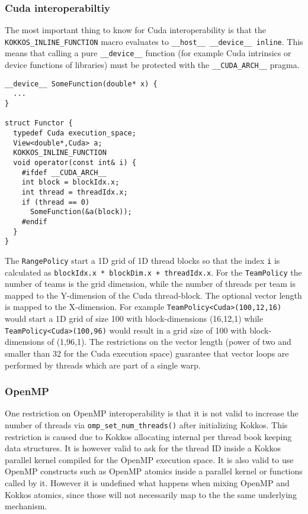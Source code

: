 \subsubsection{Cuda interoperabiltiy}

The most important thing to know for Cuda interoperability is that the
\lstinline|KOKKOS_INLINE_FUNCTION| macro evaluates to 
\lstinline|__host__ __device__ inline|. This means that calling a pure
\lstinline|__device__| function (for example Cuda intrinsics or device 
functions of libraries) must be protected with the \lstinline|__CUDA_ARCH__|
pragma.

\begin{lstlisting}
__device__ SomeFunction(double* x) {
  ...
}

struct Functor {
  typedef Cuda execution_space;
  View<double*,Cuda> a;
  KOKKOS_INLINE_FUNCTION
  void operator(const int& i) {
    #ifdef __CUDA_ARCH__
    int block = blockIdx.x;
    int thread = threadIdx.x;
    if (thread == 0)
      SomeFunction(&a(block));
    #endif
  }
}
\end{lstlisting}

The \lstinline|RangePolicy| start a 1D grid of 1D thread blocks so that the index 
\lstinline|i| is calculated as \lstinline|blockIdx.x * blockDim.x + threadIdx.x|. 
For the \lstinline|TeamPolicy| the number of teams is the grid dimension, while
the number of threads per team is mapped to the Y-dimension of the Cuda 
thread-block. The optional vector length is mapped to the X-dimension. 
For example \lstinline|TeamPolicy<Cuda>(100,12,16)| would start a 1D grid of size 
100 with block-dimensions (16,12,1) while \lstinline|TeamPolicy<Cuda>(100,96)| would 
result in a grid size of 100 with block-dimensions of (1,96,1). The restrictions on the 
vector length (power of two and smaller than 32 for the Cuda execution space) 
guarantee that vector loops are performed by threads which are part of a single 
warp. 

\subsubsection{OpenMP}

One restriction on OpenMP interoperability is that it is not valid to increase
the number of threads via \lstinline|omp_set_num_threads()| after initializing 
Kokkos. This restriction is caused due to Kokkos allocating internal per thread
book keeping data structures. It is however valid to ask 
for the thread ID inside a Kokkos parallel kernel compiled for the OpenMP 
execution space. It is also valid to use OpenMP constructs such as OpenMP
atomics inside a parallel kernel or functions called by it. However it is undefined
what happens when mixing OpenMP and Kokkos atomics, since those will not 
necessarily map to the the same underlying mechanism. 


